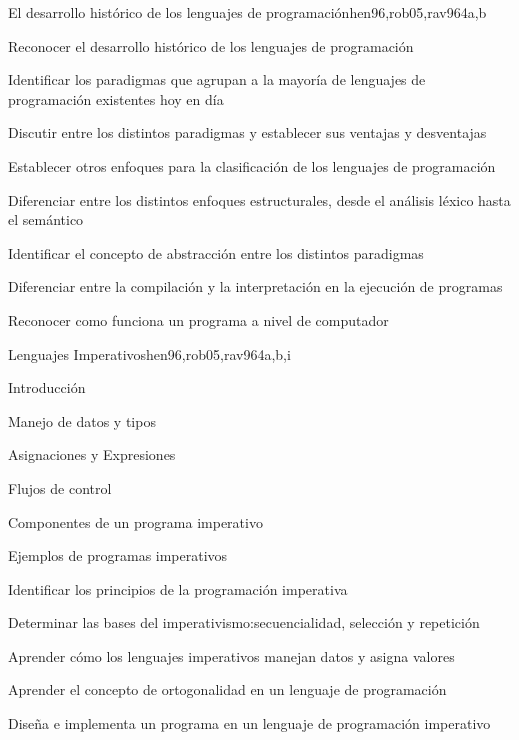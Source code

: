 \begin{syllabus}
\begin{unit}{El desarrollo histórico de los lenguajes de programación}{hen96,rob05,rav96}{4}{a,b}
   \begin{unitgoals}
      \item Reconocer el desarrollo histórico de los lenguajes de programación
      \item Identificar los paradigmas que agrupan a la mayoría de lenguajes de programación existentes hoy en día
      \item Discutir entre los distintos paradigmas y establecer sus ventajas y desventajas
      \item Establecer otros enfoques para la clasificación de los lenguajes de programación
      \item Diferenciar entre los distintos enfoques estructurales, desde el análisis léxico hasta el semántico
      \item Identificar el concepto de abstracción entre los distintos paradigmas
      \item Diferenciar entre la compilación y la interpretación en la ejecución de programas
      \item Reconocer como funciona un programa a nivel de computador
   \end{unitgoals}
\end{unit}

\begin{unit}{Lenguajes Imperativos}{hen96,rob05,rav96}{4}{a,b,i}
\begin{topics}
      \item Introducción
      \item Manejo de datos y tipos
      \item Asignaciones y Expresiones
      \item Flujos de control
      \item Componentes de un programa imperativo
      \item Ejemplos de programas imperativos
   \end{topics}

   \begin{unitgoals}
      \item Identificar los principios de la programación imperativa
      \item Determinar las bases del imperativismo:secuencialidad, selección y repetición
      \item Aprender cómo los lenguajes imperativos manejan datos y asigna valores
      \item Aprender el concepto de ortogonalidad en un lenguaje de programación
      \item Diseña e implementa un programa en un lenguaje de programación imperativo
   \end{unitgoals}
\end{unit}


\end{syllabus}
